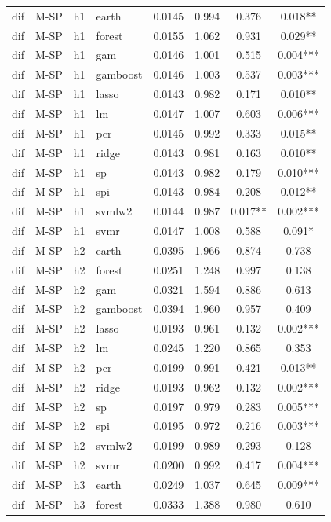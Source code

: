\begin{ThreePartTable}
\begin{longtable}[t]{llclcccc}
\addlinespace
dif & M-SP & h1 & earth & 0.0145 & 0.994 & 0.376 & 0.018**\\
dif & M-SP & h1 & forest & 0.0155 & 1.062 & 0.931 & 0.029**\\
dif & M-SP & h1 & gam & 0.0146 & 1.001 & 0.515 & 0.004***\\
dif & M-SP & h1 & gamboost & 0.0146 & 1.003 & 0.537 & 0.003***\\
dif & M-SP & h1 & lasso & 0.0143 & 0.982 & 0.171 & 0.010**\\
dif & M-SP & h1 & lm & 0.0147 & 1.007 & 0.603 & 0.006***\\
dif & M-SP & h1 & pcr & 0.0145 & 0.992 & 0.333 & 0.015**\\
dif & M-SP & h1 & ridge & 0.0143 & 0.981 & 0.163 & 0.010**\\
dif & M-SP & h1 & sp & 0.0143 & 0.982 & 0.179 & 0.010***\\
dif & M-SP & h1 & spi & 0.0143 & 0.984 & 0.208 & 0.012**\\
dif & M-SP & h1 & svmlw2 & 0.0144 & 0.987 & 0.017** & 0.002***\\
dif & M-SP & h1 & svmr & 0.0147 & 1.008 & 0.588 & 0.091*\\
\addlinespace
dif & M-SP & h2 & earth & 0.0395 & 1.966 & 0.874 & 0.738\\
dif & M-SP & h2 & forest & 0.0251 & 1.248 & 0.997 & 0.138\\
dif & M-SP & h2 & gam & 0.0321 & 1.594 & 0.886 & 0.613\\
dif & M-SP & h2 & gamboost & 0.0394 & 1.960 & 0.957 & 0.409\\
dif & M-SP & h2 & lasso & 0.0193 & 0.961 & 0.132 & 0.002***\\
dif & M-SP & h2 & lm & 0.0245 & 1.220 & 0.865 & 0.353\\
dif & M-SP & h2 & pcr & 0.0199 & 0.991 & 0.421 & 0.013**\\
dif & M-SP & h2 & ridge & 0.0193 & 0.962 & 0.132 & 0.002***\\
dif & M-SP & h2 & sp & 0.0197 & 0.979 & 0.283 & 0.005***\\
dif & M-SP & h2 & spi & 0.0195 & 0.972 & 0.216 & 0.003***\\
dif & M-SP & h2 & svmlw2 & 0.0199 & 0.989 & 0.293 & 0.128\\
dif & M-SP & h2 & svmr & 0.0200 & 0.992 & 0.417 & 0.004***\\
\addlinespace
dif & M-SP & h3 & earth & 0.0249 & 1.037 & 0.645 & 0.009***\\
dif & M-SP & h3 & forest & 0.0333 & 1.388 & 0.980 & 0.610\\

\end{longtable}
\end{ThreePartTable}

